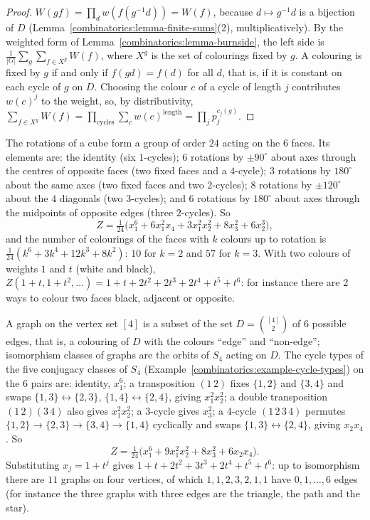 \begin{proof}
$W(gf) = \prod_dw(f(g^{-1}d)) = W(f)$, because $d \mapsto g^{-1}d$ is a bijection of $D$ (Lemma~\ref{combinatorics:lemma-finite-sums}(2), multiplicatively). By the weighted form of
Lemma~\ref{combinatorics:lemma-burnside}, the left side is $\frac{1}{|G|}\sum_g\sum_{f \in X^g}W(f)$, where $X^g$ is the set of colourings fixed by $g$. A colouring is fixed by $g$ if and only if
$f(gd) = f(d)$ for all $d$, that is, if it is constant on each cycle of $g$ on $D$. Choosing the colour $c$ of a cycle of length $j$ contributes $w(c)^j$ to the weight, so, by distributivity,
$\sum_{f \in X^g}W(f) = \prod_{\text{cycles}}\sum_cw(c)^{\text{length}} = \prod_jp_j^{c_j(g)}$.
\end{proof}

\begin{example}\label{combinatorics:example-cube}
The rotations of a cube form a group of order $24$ acting on the $6$ faces. Its elements are: the identity (six $1$-cycles); $6$ rotations by $\pm 90^\circ$ about axes through the centres of opposite faces
(two fixed faces and a $4$-cycle); $3$ rotations by $180^\circ$ about the same axes (two fixed faces and two $2$-cycles); $8$ rotations by $\pm 120^\circ$ about the $4$ diagonals (two $3$-cycles); and $6$
rotations by $180^\circ$ about axes through the midpoints of opposite edges (three $2$-cycles). So
\[
Z = \tfrac{1}{24}\bigl(x_1^6 + 6x_1^2x_4 + 3x_1^2x_2^2 + 8x_3^2 + 6x_2^3\bigr),
\]
and the number of colourings of the faces with $k$ colours up to rotation is $\frac{1}{24}(k^6 + 3k^4 + 12k^3 + 8k^2)$: $10$ for $k = 2$ and $57$ for $k = 3$. With two colours of weights $1$ and $t$
(white and black), $Z(1 + t, 1 + t^2, \ldots) = 1 + t + 2t^2 + 2t^3 + 2t^4 + t^5 + t^6$: for instance there are $2$ ways to colour two faces black, adjacent or opposite.
\end{example}

\begin{example}\label{combinatorics:example-graphs-four-vertices}
A graph on the vertex set $[4]$ is a subset of the set $D = \binom{[4]}{2}$ of $6$ possible edges, that is, a colouring of $D$ with the colours ``edge'' and ``non-edge''; isomorphism classes of graphs
are the orbits of $S_4$ acting on $D$. The cycle types of the five conjugacy classes of $S_4$ (Example~\ref{combinatorics:example-cycle-types}) on the $6$ pairs are: identity, $x_1^6$; a transposition
$(1\,2)$ fixes $\{1, 2\}$ and $\{3, 4\}$ and swaps $\{1, 3\} \leftrightarrow \{2, 3\}$, $\{1, 4\} \leftrightarrow \{2, 4\}$, giving $x_1^2x_2^2$; a double transposition $(1\,2)(3\,4)$ also gives
$x_1^2x_2^2$; a $3$-cycle gives $x_3^2$; a $4$-cycle $(1\,2\,3\,4)$ permutes $\{1,2\} \to \{2,3\} \to \{3,4\} \to \{1,4\}$ cyclically and swaps $\{1,3\} \leftrightarrow \{2,4\}$, giving $x_2x_4$. So
\[
Z = \tfrac{1}{24}\bigl(x_1^6 + 9x_1^2x_2^2 + 8x_3^2 + 6x_2x_4\bigr).
\]
Substituting $x_j = 1 + t^j$ gives $1 + t + 2t^2 + 3t^3 + 2t^4 + t^5 + t^6$: up to isomorphism there are $11$ graphs on four vertices, of which $1, 1, 2, 3, 2, 1, 1$ have $0, 1, \ldots, 6$ edges (for
instance the three graphs with three edges are the triangle, the path and the star).
\end{example}

